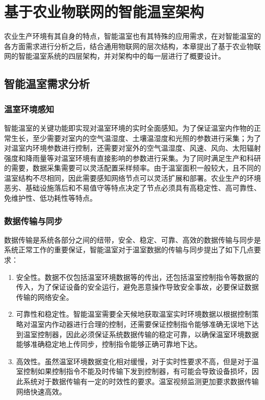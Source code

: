 
\chapter{基于农业物联网的智能温室架构}
\label{chapter:IoT Architecture}
农业生产环境有其自身的特点，智能温室也有其特殊的应用需求，在对智能温室的各方面需求进行分析之后，结合通用物联网的层次结构，本章提出了基于农业物联网的智能温室系统的四层架构，并对架构中的每一层进行了概要设计。

\section{智能温室需求分析}
	\subsection{温室环境感知}
智能温室的关键功能即实现对温室环境的实时全面感知。为了保证温室内作物的正常生长，至少需要对室内的空气温湿度、土壤温湿度和光照的参数进行采集；为了对温室内环境参数进行控制，还需要对室外的空气温湿度、风速、风向、太阳辐射强度和降雨量等对温室环境有直接影响的参数进行采集。为了同时满足生产和科研的需要，数据采集需要可以灵活配置采样频率。由于温室面积一般较大，且不同的温室结构不尽相同，因此需要感知网络节点可以灵活扩展和部署。农业生产的环境恶劣、基础设施落后和不易值守等特点决定了节点必须具有高稳定性、高可靠性、免维护性、低功耗性等特点。
	\subsection{数据传输与同步}
数据传输是系统各部分之间的纽带，安全、稳定、可靠、高效的数据传输与同步是系统正常工作的重要保证，智能温室对于温室数据的传输与同步提出了如下几点要求：
		\begin{enumerate}
			\item 安全性。数据不仅包括温室环境数据等的传出，还包括温室控制指令等数据的传入，为了保证设备的安全运行，避免恶意操作导致安全事故，必要保证数据传输的网络安全。
			\item 可靠性和稳定性。智能温室需要全天候地获取温室实时环境数据以根据控制策略对温室内作动器进行合理的控制，还需要保证控制指令能够准确无误地下达到温室控制器，因此必须保证系统数据传输的稳定可靠，以确保温室环境数据能够准确稳定地上传同步，控制指令能够正确可靠地下达。
			\item 高效性。虽然温室环境数据变化相对缓慢，对于实时性要求不高，但是对于温室控制如果控制指令不能及时传输下发到控制器，有可能会导致设备损坏，因此系统对于数据传输有一定的时效性的要求。温室视频监测更加要求数据传输网络快速高效。	
		\end{enumerate}

